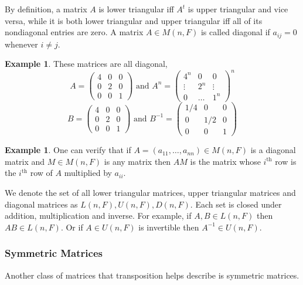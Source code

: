 \documentclass[12pt]{amsart}
\theoremstyle{definition}
\newtheorem{example}[theorem]{Example}
\begin{document}
By definition, a matrix $A$ is lower triangular iff $A^t$ is upper triangular and vice versa, while it is both lower triangular and upper triangular iff all of its nondiagonal entries are zero. 
\dfn A matrix $A \in M(n, F)$ is called diagonal if $a_{ij} = 0$ whenever $i \neq j$.

\begin{example} These matrices are all diagonal,
$$A = \left(\begin{array}{ccc} 4 & 0 & 0 \\ 0 & 2 & 0 \\ 0 & 0 & 1 \end{array}\right) \text{ and } A^n = \left(\begin{array}{ccc} 4^n & 0 & 0 \\ \vdots & 2^n & \vdots \\ 0 & \dots & 1^n \end{array}\right)^n$$
$$B = \left(\begin{array}{ccc} 4 & 0 & 0 \\ 0 & 2 & 0 \\ 0 & 0 &1 \end{array}\right) \text{ and } B^{-1} = \left(\begin{array}{ccc} 1/4 & 0 & 0 \\ 0 & 1/2 & 0\\ 0 & 0 &1 \end{array}\right)$$
\end{example}

\begin{example}\label{} One can verify that if $A = (a_{11}, \dots , a_{nn}) \in M(n, F)$ is a diagonal matrix and $M \in M(n, F)$ is any matrix then $AM$ is the matrix whose $i^{\text{th}}$ row is the $i^{\text{th}}$ row of $A$ multiplied by $a_{ii}$.
\end{example}

We denote the set of all lower triangular matrices, upper triangular matrices and diagonal matrices as $L(n,F), U(n,F), D(n,F)$. Each set is closed under addition, multiplication and inverse. For example, if $A, B \in L(n,F)$ then $AB \in L(n,F)$. Or if $A \in U(n,F)$ is invertible then $A^{-1} \in U(n,F)$.

\subsubsection{Symmetric Matrices} Another class of matrices that transposition helps describe is symmetric matrices.
\end{document}
